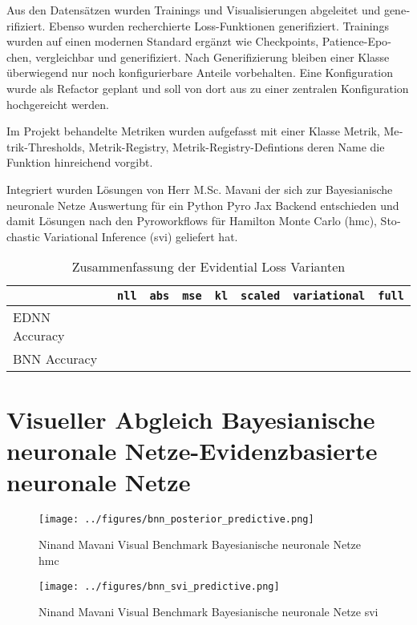 \begin{otherlanguage}{ngerman}
Aus den Datensätzen wurden Trainings und Visualisierungen abgeleitet und generifiziert. Ebenso wurden recherchierte Loss-Funktionen generifiziert. Trainings wurden auf einen modernen Standard ergänzt wie Checkpoints, Patience-Epochen, vergleichbar und generifiziert. Nach Generifizierung bleiben einer Klasse überwiegend nur noch konfigurierbare Anteile vorbehalten. Eine Konfiguration wurde als Refactor geplant und soll von dort aus zu einer zentralen Konfiguration hochgereicht werden.\newline

Im Projekt behandelte Metriken wurden aufgefasst mit einer Klasse Metrik, Metrik-Thresholds, Metrik-Registry, Metrik-Registry-Defintions deren Name die Funktion hinreichend vorgibt.\newline

Integriert wurden Lösungen von Herr M.Sc. Mavani der sich zur \gls{Bayesianische neuronale Netze} Auswertung für ein Python Pyro Jax Backend entschieden und damit Lösungen nach den Pyroworkflows für Hamilton Monte Carlo (\gls{hmc}), Stochastic Variational Inference (\gls{svi}) geliefert hat.



\begin{table}[htbp]
\centering
\begin{tabularx}{\textwidth}{|l|l|l|l|l|l|l|X|}
\hline
 & \texttt{nll} & \texttt{abs} & \texttt{mse} & \texttt{kl} & \texttt{scaled} & \texttt{variational} & \texttt{full} \\
\hline
EDNN Accuracy & & & & & & & \\
\hline
BNN Accuracy & & & & & & & \\
\hline
\end{tabularx}
\caption{Zusammenfassung der Evidential Loss Varianten}
\end{table}


\section*{Visueller Abgleich \gls{Bayesianische neuronale Netze}-\gls{Evidenzbasierte neuronale Netze}}

\begin{figure}[!h]
  \centering
  \begin{minipage}{0.5\textwidth}
      \centering
      \texttt{[image: ../figures/bnn\_posterior\_predictive.png]}
      \caption{Ninand Mavani Visual Benchmark \gls{Bayesianische neuronale Netze} \gls{hmc}}
  \end{minipage}%
  \begin{minipage}{0.5\textwidth}
      \centering
      \texttt{[image: ../figures/bnn\_svi\_predictive.png]}
      \caption{Ninand Mavani Visual Benchmark \gls{Bayesianische neuronale Netze} \gls{svi}}
  \end{minipage}
\end{figure}



\end{otherlanguage}

